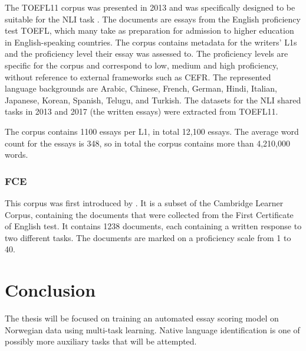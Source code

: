 The TOEFL11 corpus was presented in 2013 and was specifically designed to be
suitable for the \ac{NLI} task \autocite{blanchard13}. The documents are
essays from the English proficiency test TOEFL, which many take as
preparation for admission to higher education in English-speaking countries.
The corpus contains metadata for the writers' L1s and the proficiency level
their essay was assessed to. The proficiency levels are specific for the
corpus and correspond to low, medium and high proficiency, without reference
to external frameworks such as \ac{CEFR}. The represented language
backgrounds are Arabic, Chinese, French, German, Hindi, Italian, Japanese,
Korean, Spanish, Telugu, and Turkish. The datasets for the \ac{NLI} shared
tasks in 2013 and 2017 (the written essays) were extracted from TOEFL11.

The corpus contains 1100 essays per L1, in total 12,100 essays. The average
word count for the essays is 348, so in total the corpus contains more than
4,210,000 words.


\subsubsection{FCE}

This corpus was first introduced by \textcite{yannakoudakis2011new}. It is a
subset of the Cambridge Learner Corpus, containing the documents that were
collected from the First Certificate of English test. It contains 1238
documents, each containing a written response to two different tasks. The
documents are marked on a proficiency scale from 1 to 40.


\section{Conclusion}

The thesis will be focused on training an automated essay scoring model on
Norwegian data using multi-task learning. Native language identification is
one of possibly more auxiliary tasks that will be attempted.
